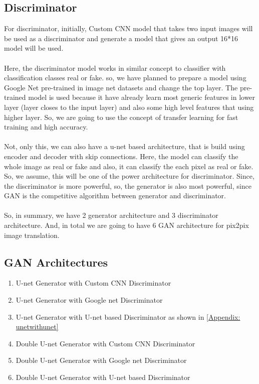             \subsection{Discriminator}\label{subsection:Discriminator}
                For discriminator, initially, Custom CNN model that takes two input images will be used as a discriminator and generate a model that gives an output 16*16 model will be used. \\\\
                Here, the discriminator model works in similar concept to classifier with classification classes real or fake. so, we have planned to prepare a model using Google Net pre-trained in image net datasets and change the top layer. The pre-trained model is used because it have already learn most generic features in lower layer (layer closes to the input layer) and also some high level features that using higher layer. So, we are going to use the concept of transfer learning for fast training and high accuracy. \\\\
                Not, only this, we can also have a u-net based architecture, that is build using encoder and decoder with skip connections. Here, the model can classify the whole image as real or fake and also, it can classify the each pixel as real or fake. So, we assume, this will be one of the power architecture for discriminator. Since, the discriminator is more powerful, so, the generator is also most powerful, since GAN is the competitive algorithm between generator and discriminator. \\\\
                So, in summary, we have 2 generator architecture and 3 discriminator architecture. And, in total we are going to have 6 GAN architecture for pix2pix image translation. 
    
            \subsection{GAN Architectures\label{subsection:ganarchitectures}}
            \begin{enumerate}[label=\alph*.]
                \item U-net Generator with Custom CNN Discriminator
                \item U-net Generator with Google net Discriminator
                \item U-net Generator with U-net based Discriminator as shown in \ref{Appendix: unetwithunet}
                \item Double U-net Generator with Custom CNN Discriminator
                \item Double U-net Generator with Google net Discriminator 
                \item Double U-net Generator with U-net based Discriminator
            \end{enumerate}
